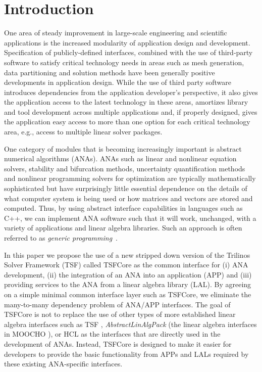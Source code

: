 \section{Introduction}

One area of steady improvement in large-scale engineering and
scientific applications is the increased modularity of application
design and development.  Specification of publicly-defined interfaces,
combined with the use of third-party software to satisfy critical
technology needs in areas such as mesh generation, data partitioning
and solution methods have been generally positive developments in
application design.  While the use of third party software introduces
dependencies from the application developer's perspective, it also
gives the application access to the latest technology in these areas,
amortizes library and tool development across multiple applications
and, if properly designed, gives the application easy access to more
than one option for each critical technology area, e.g., access to
multiple linear solver packages.

One category of modules that is becoming
increasingly important is abstract numerical algorithms (ANAs).  ANAs
such as linear and nonlinear equation solvers,
stability and bifurcation methods,
uncertainty quantification methods and nonlinear programming solvers
for optimization are typically mathematically 
sophisticated but have surprisingly little essential dependence on the
details of what computer system is being used or how matrices and
vectors are stored and computed.  Thus, by using abstract
interface capabilities in languages such as C++, we can implement ANA
software such that it will work, unchanged, with a variety of
applications and linear algebra libraries.  Such an approach is often
referred to as {\it generic programming}~\cite{ref:boost_generic_programming}.

In this paper we propose the use of a new stripped down version of the
Trilinos Solver Framework (TSF) called TSFCore as the common interface
for (i) ANA development, (ii) the integration of an ANA into an
application (APP) and (iii) providing services to the ANA from a
linear algebra library (LAL).  By agreeing on a simple minimal common
interface layer such as TSFCore, we eliminate the many-to-many
dependency problem of ANA/APP interfaces.  The goal of TSFCore is not
to replace the use of other types of more established linear algebra
interfaces such as TSF \cite{ref:TSF}, \textit{AbstractLinAlgPack}
(the linear algebra interfaces in MOOCHO \cite{ref:moochouserguide}),
or HCL \cite{ref:hcl} as the interfaces that are directly used in the
development of ANAs.  Instead, TSFCore is designed to make it easier
for developers to provide the basic functionality from APPs and LALs
required by these existing ANA-specific interfaces.


